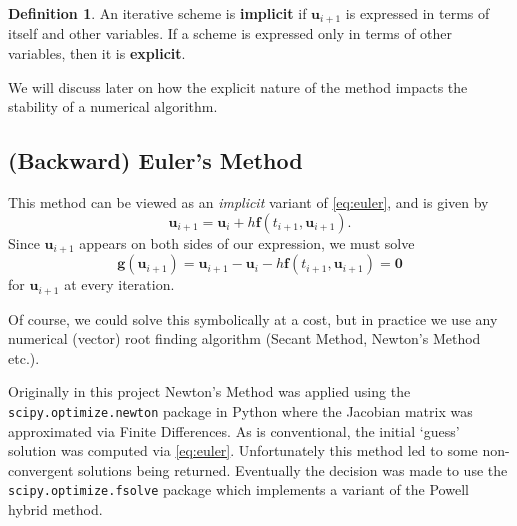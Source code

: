 \documentclass[12pt, twoside]{report}
\theoremstyle{plain}
\theoremstyle{definition}
\newtheorem{definition}{Definition}[chapter]
\begin{document}
            \begin{definition}
                An iterative scheme is \textbf{implicit} if $\mathbf{u}_{i+1}$
                is expressed in terms of itself and other variables. If a 
                scheme is expressed only in terms of other variables, then it
                is \textbf{explicit}. 
            \end{definition}

            We will discuss later on how the explicit nature of the method
            impacts the stability of a numerical algorithm.

        \subsection{(Backward) Euler's Method}
        \label{2_backward_euler}
            This method can be viewed as an \textit{implicit} variant of 
            \eqref{eq:euler}, and is given by
            \begin{equation}
            \label{eq:backward_euler}
                \mathbf{u}_{i+1} = \mathbf{u}_i + h\mathbf{f}(t_{i+1}, 
                \mathbf{u}_{i+1}).
            \end{equation} 
            Since $\mathbf{u}_{i+1}$ appears on both sides of our expression,
            we must solve
            \begin{equation}
                \mathbf{g}(\mathbf{u}_{i+1}) = \mathbf{u}_{i+1} - 
                \mathbf{u}_i - h\mathbf{f}(t_{i+1}, \mathbf{u}_{i+1}) 
                = \mathbf{0}
            \end{equation}
            for $\mathbf{u}_{i+1}$ at every iteration.

            Of course, we could solve this symbolically at a cost, but in
            practice we use any numerical (vector) root finding algorithm 
            (Secant Method, Newton's Method etc.). 

            Originally in this project Newton's Method was applied using the 
            \texttt{scipy.optimize.newton} package in Python where 
            the Jacobian matrix was approximated via Finite Differences. As is 
            conventional, the initial `guess' solution was computed via 
            \eqref{eq:euler}. Unfortunately this method led to some 
            non-convergent solutions being returned. Eventually the decision 
            was made to use the \texttt{scipy.optimize.fsolve} 
            package which implements a variant of the Powell hybrid method.
\end{document}

